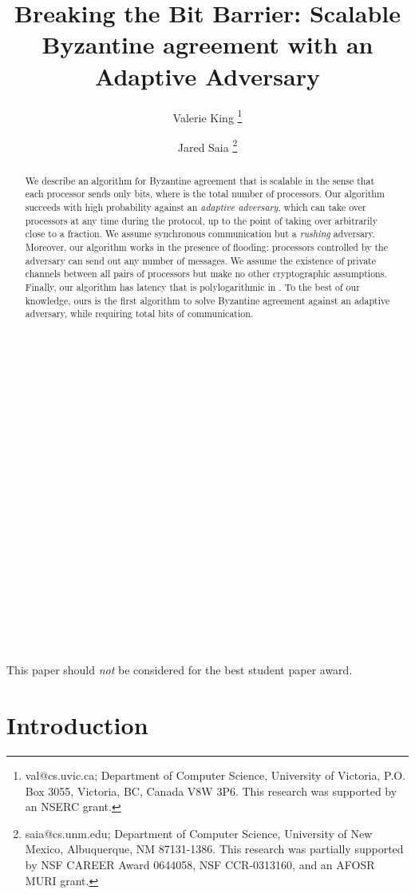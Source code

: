 \documentclass[letterpaper,11pt]{article}
\title{Breaking the  Bit Barrier: Scalable Byzantine agreement with an Adaptive Adversary}
\author{Valerie King \thanks{val@cs.uvic.ca; Department of Computer Science, University of Victoria, P.O.
Box 3055, Victoria, BC, Canada V8W 3P6.  This research was supported by an NSERC grant.} \and Jared Saia \thanks{saia@cs.unm.edu; Department of Computer Science, University of New Mexico, Albuquerque, NM 87131-1386. This research was partially supported by NSF CAREER Award 0644058, NSF CCR-0313160, and an AFOSR MURI grant.}}
\date{}
\begin{document}
\maketitle

\thispagestyle{empty}


\begin{abstract}

We describe an algorithm for Byzantine agreement that is scalable in the sense that each processor sends only  bits, where  is the total number of processors.  Our algorithm succeeds with high probability against an \emph{adaptive adversary}, which can take over processors at any time during the protocol, up to the point of taking over arbitrarily close to a  fraction.  We assume synchronous communication but a \emph{rushing} adversary.  Moreover, our algorithm works in the presence of flooding: processors controlled by the adversary can send out any number of messages.  We assume the existence of private channels between all pairs of processors but make no other cryptographic assumptions.  Finally, our algorithm has latency that is polylogarithmic in .  To the best of our knowledge, ours is the first algorithm to solve Byzantine agreement against an adaptive adversary, while requiring  total bits of communication.
\end{abstract}


\ \\ \ \\ \ \\ \ \\ \ \\ \ \\ \ \\ \ \\ \ \\ \ \\ \ \\ \ \\ \ \\ \ \\ \ \\ \ \\ \ \\ \ \\ \ \\

This paper should \emph{not} be considered for the best student paper award.


\pagebreak
\setcounter{page}{1}

\section{Introduction}
\end{document}
